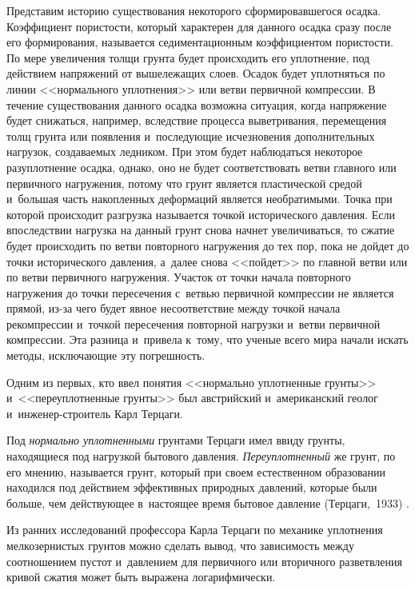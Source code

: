 Представим историю существования некоторого сформировавшегося осадка. 
Коэффициент пористости, который характерен для данного осадка сразу после его формирования, называется седиментационным коэффициентом пористости. 
По мере увеличения толщи грунта будет происходить его уплотнение, под действием напряжений от вышележащих слоев.
Осадок будет уплотняться по линии <<нормального уплотнения>> или ветви первичной компрессии. 
В течение существования данного осадка возможна ситуация, когда напряжение будет снижаться, например, вследствие процесса выветривания, перемещения толщ грунта или появления и~последующие исчезновения дополнительных нагрузок, создаваемых ледником. 
При этом будет наблюдаться некоторое разуплотнение осадка, однако, оно не будет соответствовать ветви главного или первичного нагружения, потому что грунт является пластической средой и~большая часть накопленных деформаций является необратимыми. 
Точка при которой происходит разгрузка называется точкой исторического давления. 
Если впоследствии нагрузка на данный грунт снова начнет увеличиваться, то сжатие будет происходить по ветви повторного нагружения до тех пор, пока не дойдет до точки исторического давления, а~далее снова <<пойдет>> по главной ветви или по ветви первичного нагружения. 
Участок от точки начала повторного нагружения до точки пересечения с~ветвью первичной компрессии не является прямой, из-за чего будет явное несоответствие между точкой начала рекомпрессии и~точкой пересечения повторной нагрузки и~ветви первичной компрессии. 
Эта разница и~привела к~тому, что ученые всего мира начали искать методы, исключающие эту погрешность.

Одним из первых, кто ввел понятия <<нормально уплотненные грунты>> и~<<переуплотненные грунты>> был австрийский и~американский геолог и~инженер-строитель Карл Терцаги.

 Под \textit{нормально уплотненными} грунтами Терцаги имел ввиду грунты, находящиеся под нагрузкой бытового давления.
 \textit{Переуплотненный} же грунт, по его мнению, называется грунт, который при своем естественном образовании находился под действием эффективных природных давлений, которые были больше, чем действующее в~настоящее время бытовое давление (Терцаги,~1933) \cite{terz1933}.

Из ранних исследований профессора Карла Терцаги по механике уплотнения мелкозернистых грунтов можно сделать вывод, что зависимость между соотношением пустот и~давлением для первичного или вторичного разветвления кривой сжатия может быть выражена логарифмически. 

